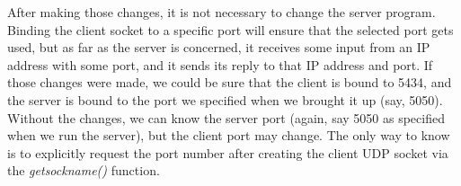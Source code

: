 \documentclass{article}
\begin{document}
\begin{enumerate}
    After making those changes, it is not necessary to change the server program.  Binding the client socket to a specific port will ensure that the selected port gets used, but as far as the server is concerned, it receives some input from an IP address with some port, and it sends its reply to that IP address and port.  If those changes were made, we could be sure that the client is bound to 5434, and the server is bound to the port we specified when we brought it up (say, 5050).  Without the changes, we can know the server port (again, say 5050 as specified when we run the server), but the client port may change.  The only way to know is to explicitly request the port number after creating the client UDP socket via the {\emph{getsockname()}} function.

\end{enumerate}
\end{document}
